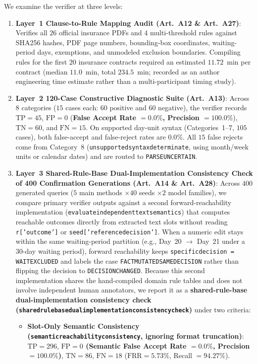 \documentclass[10pt,twocolumn]{article}
\renewcommand{\_}{\textunderscore\allowbreak}
\begin{document}
We examine the verifier at three levels:
\begin{enumerate}[leftmargin=*,nosep]
  \item \textbf{Layer~1 Clause-to-Rule Mapping Audit (Art.~A12 \& Art.~A27)}: Verifies all $26$ official insurance PDFs and $4$ multi-threshold rules against SHA256 hashes, PDF page numbers, bounding-box coordinates, waiting-period days, exemptions, and unmodeled exclusion boundaries. Compiling rules for the first $20$ insurance contracts required an estimated $11.72$~min per contract (median $11.0$~min, total $234.5$~min; recorded as an author engineering time estimate rather than a multi-participant timing study).
  \item \textbf{Layer~2 120-Case Constructive Diagnostic Suite (Art.~A13)}: Across $8$ categories ($15$ cases each: $60$ positive and $60$ negative), the verifier records $\text{TP}=45$, $\text{FP}=0$ (\textbf{False Accept Rate $= 0.0\%$, Precision $= 100.0\%$}), $\text{TN}=60$, and $\text{FN}=15$. On supported day-unit syntax (Categories~1--7, $105$ cases), both false-accept and false-reject rates are $0.0\%$. All $15$ false rejects come from Category~8 (\texttt{unsupported\_syntax\_determinate}, using month/week units or calendar dates) and are routed to \texttt{PARSE\_UNCERTAIN}.
  \item \textbf{Layer~3 Shared-Rule-Base Dual-Implementation Consistency Check of 400 Confirmation Generations (Art.~A14 \& Art.~A28)}: Across $400$ generated queries ($5$ main methods $\times 40$ seeds $\times 2$ model families), we compare primary verifier outputs against a second forward-reachability implementation (\texttt{evaluate\_independent\_text\_semantics}) that computes reachable outcomes directly from extracted text slots without reading \texttt{r['outcome']} or \texttt{seed['reference\_decision']}. When a numeric edit stays within the same waiting-period partition (e.g., Day~20 $\rightarrow$ Day~21 under a 30-day waiting period), forward reachability keeps \texttt{specific\_decision = WAIT\_EXCLUDED} and labels the case \texttt{FACT\_MUTATED\_SAME\_DECISION} rather than flipping the decision to \texttt{DECISION\_CHANGED}. Because this second implementation shares the hand-compiled domain rule tables and does not involve independent human annotators, we report it as a \textbf{shared-rule-base dual-implementation consistency check (\texttt{shared\_rule\_base\_dual\_implementation\_consistency\_check})} under two criteria:
  \begin{itemize}[leftmargin=*,nosep]
    \item \textbf{Slot-Only Semantic Consistency (\texttt{semantic\_reachability\_consistency}, ignoring format truncation)}: $\text{TP}=296$, \textbf{$\text{FP}=0$ (Semantic False Accept Rate $= 0.0\%$, Precision $= 100.0\%$)}, $\text{TN}=86$, $\text{FN}=18$ ($\text{FRR}=5.73\%$, Recall $= 94.27\%$).

\end{itemize}
\end{enumerate}
\end{document}
